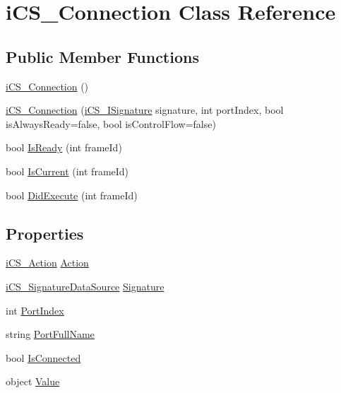\hypertarget{classi_c_s___connection}{\section{i\+C\+S\+\_\+\+Connection Class Reference}
\label{classi_c_s___connection}
}
\subsection*{Public Member Functions}
\begin{DoxyCompactItemize}
\item 
\hyperlink{classi_c_s___connection_a3efb08061a6cc7a37e3714aef545f6a0}{i\+C\+S\+\_\+\+Connection} ()
\item 
\hyperlink{classi_c_s___connection_a8f271b788e68ff5d36fdff3184583a66}{i\+C\+S\+\_\+\+Connection} (\hyperlink{interfacei_c_s___i_signature}{i\+C\+S\+\_\+\+I\+Signature} signature, int port\+Index, bool is\+Always\+Ready=false, bool is\+Control\+Flow=false)
\item 
bool \hyperlink{classi_c_s___connection_acefe5f465ed1073856aeb023b34872f3}{Is\+Ready} (int frame\+Id)
\item 
bool \hyperlink{classi_c_s___connection_a0c2866e28294459476da0b5bc1b59aba}{Is\+Current} (int frame\+Id)
\item 
bool \hyperlink{classi_c_s___connection_a670a652015fcbd4910a4222134337d8a}{Did\+Execute} (int frame\+Id)
\end{DoxyCompactItemize}
\subsection*{Properties}
\begin{DoxyCompactItemize}
\item 
\hyperlink{classi_c_s___action}{i\+C\+S\+\_\+\+Action} \hyperlink{classi_c_s___connection_a2916ec86e442fb99344b54b3af149e51}{Action}
\item 
\hyperlink{classi_c_s___signature_data_source}{i\+C\+S\+\_\+\+Signature\+Data\+Source} \hyperlink{classi_c_s___connection_a0da9c6820b1c1ffa79dd4b6c579663d4}{Signature}
\item 
int \hyperlink{classi_c_s___connection_a5be393593433195d9ecac7b2af5b5d61}{Port\+Index}
\item 
string \hyperlink{classi_c_s___connection_a1540678af90601d706f5cd570534887f}{Port\+Full\+Name}
\item 
bool \hyperlink{classi_c_s___connection_a487e8bf1d3815f9d716aaf36caf54479}{Is\+Connected}
\item 
object \hyperlink{classi_c_s___connection_ae2e972595fe941e54083006aefac72cd}{Value}
\end{DoxyCompactItemize}


